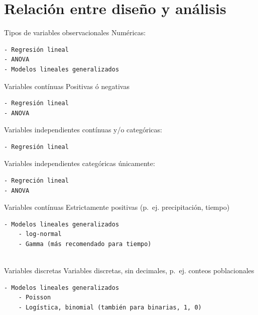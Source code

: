\documentclass[
  11pt,
  ignorenonframetext,
]{beamer}
\begin{document}
\hypertarget{relaciuxf3n-entre-diseuxf1o-y-anuxe1lisis}{%
\section{Relación entre diseño y
análisis}\label{relaciuxf3n-entre-diseuxf1o-y-anuxe1lisis}}

\begin{frame}[fragile]{Tipos de variables observacionales}
\protect\hypertarget{tipos-de-variables-observacionales}{}
Numéricas:

\begin{verbatim}
- Regresión lineal
- ANOVA
- Modelos lineales generalizados
\end{verbatim}
\end{frame}

\begin{frame}[fragile]{Variables contínuas}
\protect\hypertarget{variables-contuxednuas}{}
Positivas ó negativas

\begin{verbatim}
- Regresión lineal
- ANOVA
\end{verbatim}

Variables independientes contínuas y/o categóricas:

\begin{verbatim}
- Regresión lineal
\end{verbatim}

Variables independientes categóricas únicamente:

\begin{verbatim}
- Regreción lineal
- ANOVA
\end{verbatim}
\end{frame}

\begin{frame}[fragile]{Variables contínuas}
\protect\hypertarget{variables-contuxednuas-1}{}
Estrictamente positivas (p.~ej. precipitación, tiempo)

\begin{verbatim}
- Modelos lineales generalizados
    - log-normal
    - Gamma (más recomendado para tiempo)
    
\end{verbatim}
\end{frame}

\begin{frame}[fragile]{Variables discretas}
\protect\hypertarget{variables-discretas}{}
Variables discretas, sin decimales, p.~ej. conteos poblacionales

\begin{verbatim}
- Modelos lineales generalizados
    - Poisson
    - Logística, binomial (también para binarias, 1, 0)
    
\end{verbatim}
\end{frame}
\end{document}
